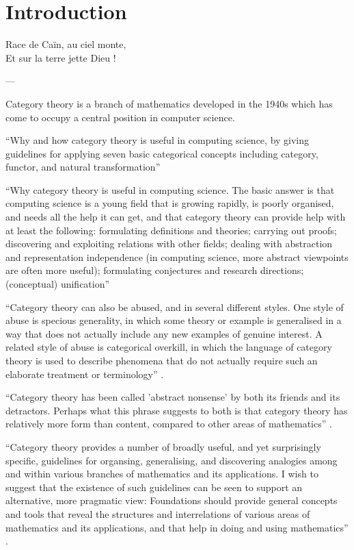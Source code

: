 \chapter{Introduction}
\label{chap:introduction}

\epigraph{
  Race de Caïn, au ciel monte,\\
  Et sur la terre jette Dieu !
}{---\textcite[16]{baudelaire-1857}}

Category theory is a branch of mathematics developed in the 1940s
which has come to occupy a central position in computer science.







``Why and how category theory is useful in computing science, by
giving guidelines for applying seven basic categorical concepts
including category, functor, and natural transformation''
\parencite[49]{goguen-1991}

``Why category theory is useful in computing science. The basic answer
is that computing science is a young field that is growing rapidly, is
poorly organised, and needs all the help it can get, and that category
theory can provide help with at least the following: formulating
definitions and theories; carrying out proofs; discovering and
exploiting relations with other fields; dealing with abstraction and
representation independence (in computing science, more abstract
viewpoints are often more useful); formulating conjectures and
research directions; (conceptual) unification''
\parencite[49--50]{goguen-1991}

``Category theory can also be abused, and in several different styles.
One style of abuse is specious generality, in which some theory or
example is generalised in a way that does not actually include any new
examples of genuine interest. A related style of abuse is categorical
overkill, in which the language of category theory is used to describe
phenomena that do not actually require such an elaborate treatment or
terminology'' \parencite[50]{goguen-1991}.

``Category theory has been called 'abstract nonsense' by both its
friends and its detractors. Perhaps what this phrase suggests to both
is that category theory has relatively more form than content,
compared to other areas of mathematics'' \parencite[50]{goguen-1991}.

``Category theory provides a number of broadly useful, and yet
surprisingly specific, guidelines for organsing, generalising, and
discovering analogies among and within various branches of mathematics
and its applications. I wish to suggest that the existence of such
guidelines can be seen to support an alternative, more pragmatic view:
Foundations should provide general concepts and tools that reveal the
structures and interrelations of various areas of mathematics and its
applications, and that help in doing and using mathematics''
\parencite[64]{goguen-1991}.

